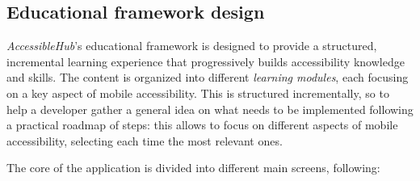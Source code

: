 \subsection{Educational framework design}
\label{sec:accessiblehub-educational-framework}

\textit{AccessibleHub}'s educational framework is designed to provide a structured, incremental learning experience that progressively builds accessibility knowledge and skills. The content is organized into different \textit{learning modules}, each focusing on a key aspect of mobile accessibility. This is structured incrementally, so to help a developer gather a general idea on what needs to be implemented following a practical roadmap of steps: this allows to focus on different aspects of mobile accessibility, selecting each time the most relevant ones.

The core of the application is divided into different main screens, following:

